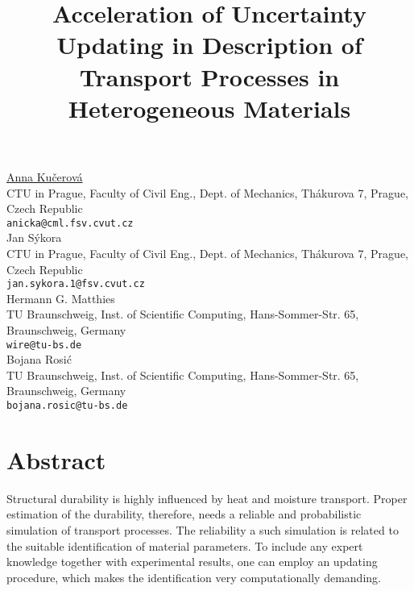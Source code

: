 \title{Acceleration of Uncertainty Updating in Description of Transport Processes in Heterogeneous Materials}
\author{} \institute{} %
\maketitle
\begin{center}
{\large \underline{Anna Ku\v{c}erov\'a}}\\
CTU in Prague, Faculty of Civil Eng., Dept. of Mechanics, Th\'akurova 7, Prague, Czech Republic\\
{\tt anicka@cml.fsv.cvut.cz}\\
\vspace{4mm} %
{\large Jan S\'ykora}\\
CTU in Prague, Faculty of Civil Eng., Dept. of Mechanics, Th\'akurova 7, Prague, Czech Republic\\
{\tt jan.sykora.1@fsv.cvut.cz}\\
\vspace{4mm} %
{\large Hermann G. Matthies}\\
TU Braunschweig, Inst. of Scientific Computing, Hans-Sommer-Str. 65, Braunschweig, Germany\\
{\tt wire@tu-bs.de}\\
\vspace{4mm} %
{\large Bojana Rosi\'c}\\
TU Braunschweig, Inst. of Scientific Computing, Hans-Sommer-Str. 65, Braunschweig, Germany\\
{\tt bojana.rosic@tu-bs.de}
\end{center}

\section*{Abstract}

Structural durability is highly influenced by heat and moisture
transport. Proper estimation of the durability, therefore, needs a
reliable and probabilistic simulation of transport processes.  The
reliability a such simulation is related to the suitable
identification of material parameters. To include any expert knowledge
together with experimental results, one can employ an updating
procedure, which makes the identification very computationally
demanding.

